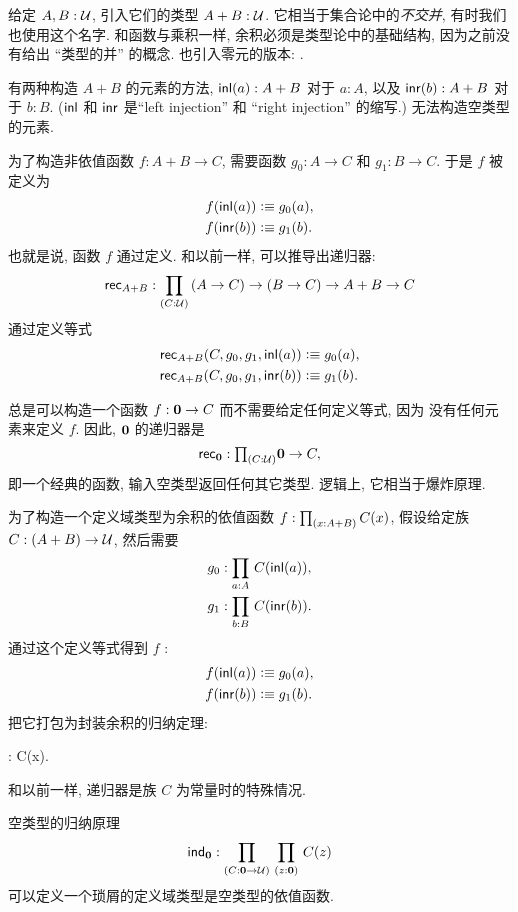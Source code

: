 给定 $A,B:\mathcal{U}$, 引入它们的类型 $A+B:\mathcal{U}$.
%
%
%
%
%
%
它相当于集合论中的\emph{不交并}, 有时我们也使用这个名字.
和函数与乘积一样, 余积必须是类型论中的基础结构, 因为之前没有给出 ``类型的并'' 的概念.
也引入零元的版本: .
%
%
%

有两种构造 $A+B$ 的元素的方法, ${\mathsf{inl}}(a) : A+B$ 对于 $a:A$, 以及 ${\mathsf{inr}}(b):A+B$ 对于 $b:B$.
(${\mathsf{inl}}$ 和 ${\mathsf{inr}}$ 是``left injection'' 和 ``right injection'' 的缩写.)
无法构造空类型的元素.

为了构造非依值函数 $f : A+B \to C$, 需要函数 $g_0 : A \to C$ 和 $g_1 : B \to C$.
于是 $f$ 被定义为
\begin{align*}
    f({\mathsf{inl}}(a)) &\vcentcolon\equiv g_0(a), \\
    f({\mathsf{inr}}(b)) &\vcentcolon\equiv g_1(b).
\end{align*}
也就是说, 函数 $f$ 通过定义.
%
和以前一样, 可以推导出递归器:
%
\[ \rec{A+B} : \dprd{C:\UU}(A \to C) \to (B\to C) \to A+B \to C\]
通过定义等式
\begin{align*}
    \mathsf{rec}_{A+B}(C,g_0,g_1,{\mathsf{inl}}(a)) &\vcentcolon\equiv g_0(a), \\
    \mathsf{rec}_{A+B}(C,g_0,g_1,{\mathsf{inr}}(b)) &\vcentcolon\equiv g_1(b).
\end{align*}

总是可以构造一个函数 $f : \mathbf{0} \to C$ 而不需要给定任何定义等式, 因为 \emptyt 没有任何元素来定义 $f$.
因此, $\mathbf{0}$ 的递归器是
%
\[\rec{\emptyt} : \tprd{C:\UU} \emptyt \to C,\]
即一个经典的函数, 输入空类型返回任何其它类型.
逻辑上, 它相当于爆炸原理.
%

为了构造一个定义域类型为余积的依值函数 $f:\prd{x:A+B}C(x)$, 假设给定族 $C: (A + B) \to \mathcal{U}$, 然后需要
\begin{align*}
    g_0 &: \prd{a:A} C(\inl(a)), \\
    g_1 &: \prd{b:B} C(\inr(b)).
\end{align*}
通过这个定义等式得到 $f$ :
\begin{align*}
    f({\mathsf{inl}}(a)) &\vcentcolon\equiv g_0(a), \\
    f({\mathsf{inr}}(b)) &\vcentcolon\equiv g_1(b).
\end{align*}
把它打包为封装余积的归纳定理:
%
\begin{narrowmultline*}
     :
     \to \narrowbreak
     \to {}C(x).
\end{narrowmultline*}
和以前一样, 递归器是族 $C$ 为常量时的特殊情况.

空类型的归纳原理
%
\[ \ind{\emptyt} : \prd{C:\emptyt \to \UU}{z:\emptyt} C(z) \]
可以定义一个琐屑的定义域类型是空类型的依值函数.

%
%
